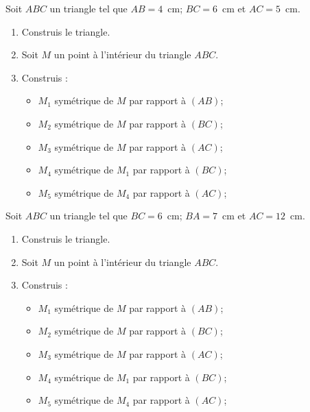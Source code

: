 \begin{myenumerate}
  \item Soit $ABC$ un triangle tel que $AB=4$~cm; $BC=6$~cm et $AC=5$~cm.
\begin{enumerate}
\item Construis le triangle.
\item Soit $M$ un point à l'intérieur du triangle $ABC$.
\item Construis :
  \begin{itemize}
  \item $M_1$ symétrique de $M$ par rapport à $(AB)$;
  \item $M_2$ symétrique de $M$ par rapport à $(BC)$;
  \item $M_3$ symétrique de $M$ par rapport à $(AC)$;
  \item $M_4$ symétrique de $M_1$ par rapport à $(BC)$;
  \item $M_5$ symétrique de $M_4$ par rapport à $(AC)$;
  \end{itemize}
\end{enumerate}
\item Soit $ABC$ un triangle tel que $BC=6$~cm; $BA=7$~cm et $AC=12$~cm.
\begin{enumerate}
\item Construis le triangle.
\item Soit $M$ un point à l'intérieur du triangle $ABC$.
\item Construis :
  \begin{itemize}
  \item $M_1$ symétrique de $M$ par rapport à $(AB)$;
  \item $M_2$ symétrique de $M$ par rapport à $(BC)$;
  \item $M_3$ symétrique de $M$ par rapport à $(AC)$;
  \item $M_4$ symétrique de $M_1$ par rapport à $(BC)$;
  \item $M_5$ symétrique de $M_4$ par rapport à $(AC)$;
  \end{itemize}
\end{enumerate}
\end{myenumerate}